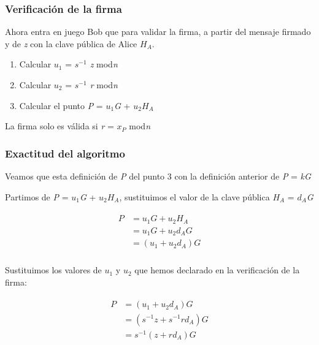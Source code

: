 \documentclass[11pt]{article}
\begin{document}
\subsubsection*{Verificación de la firma}
Ahora entra en juego Bob que para validar la firma, a partir del mensaje firmado y de \textit{z} con la clave pública de Alice \textit{$H_A$}.

\begin{enumerate}
	\item Calcular \textit{$u_1$} = \textit{$s^{-1}$ z} mod\textit{n}
	\item Calcular \textit{$u_2$} = \textit{$s^{-1}$ r} mod\textit{n}
	\item Calcular el punto \textit{P} = \textit{$u_1$G} + \textit{$u_2$$H_A$}	
\end{enumerate}

La firma solo es válida si \textit{r} = \textit{$x_P$} mod\textit{n}


\subsubsection*{Exactitud del algoritmo}
Veamos que esta definición de \textit{P} del punto 3 con la definición anterior de \textit{P} = \textit{kG}

Partimos de \textit{P} = \textit{$u_1$G} + \textit{$u_2$$H_A$}, sustituimos el valor de la clave pública \textit{$H_A$} = \textit{$d_A$G}


\begin{align}
\begin{split}
\textit{P} &= \textit{$u_1$G} + \textit{$u_2$$H_A$}\\ &= \textit{$u_1$G} + \textit{$u_2$$d_A$G}\\
&= (\textit{$u_1$} + \textit{$u_2$$d_A$})\textit{G}\\
\end{split}
\end{align}

Sustituimos los valores de $u_1$ y $u_2$ que hemos declarado en la verificación de la firma:

\begin{align}
\begin{split}
P &= (\textit{$u_1$} + \textit{$u_2$$d_A$})\textit{G}\\
&= (\textit{$s^{-1}$z} + \textit{$s^{-1}$r$d_A$}) \textit{G}\\
&= \textit{$s^{-1}$}(\textit{z} + \textit{r$d_A$}) \textit{G}\\
\end{split}
\end{align}
\end{document}
